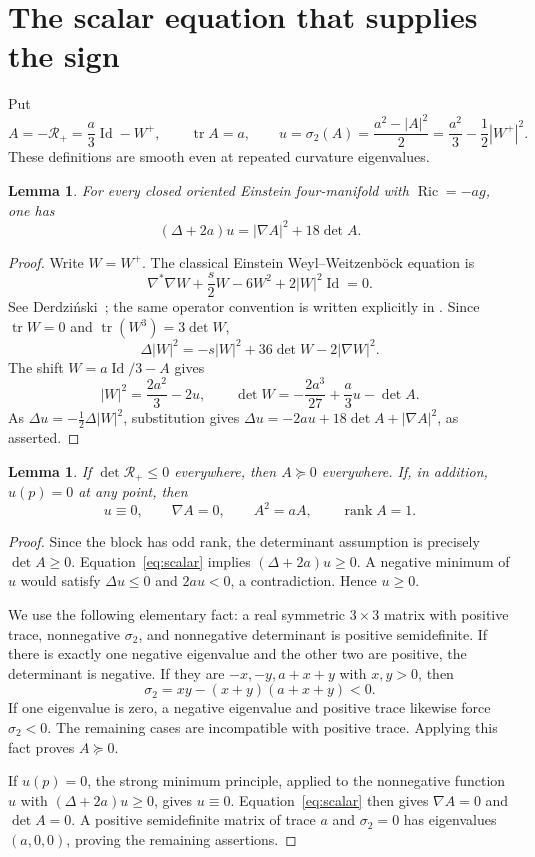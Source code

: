 \documentclass[11pt]{article}
\newtheorem{lemma}[theorem]{Lemma}
\theoremstyle{remark}\newtheorem{remark}[theorem]{Remark}
\newcommand{\Ric}{\operatorname{Ric}}
\newcommand{\tr}{\operatorname{tr}}
\newcommand{\Id}{\operatorname{Id}}
\newcommand{\RR}{\mathcal R_+}
\begin{document}
\section{The scalar equation that supplies the sign}
Put
\[
 A=-\RR=\frac a3\Id-W^+,\qquad \tr A=a,
 \qquad u=\sigma_2(A)=\frac{a^2-|A|^2}{2}
                  =\frac{a^2}{3}-\frac12|W^+|^2.
\]
These definitions are smooth even at repeated curvature eigenvalues.

\begin{lemma}\label{lem:scalar}
For every closed oriented Einstein four-manifold with $\Ric=-ag$, one has
\begin{equation}\label{eq:scalar}
 \boxed{(\Delta+2a)u=|\nabla A|^2+18\det A.}
\end{equation}
\end{lemma}
\begin{proof}
Write $W=W^+$. The classical Einstein Weyl--Weitzenb\"ock equation is
\begin{equation}\label{eq:weyl}
 \nabla^*\nabla W+\frac s2W-6W^2+2|W|^2\Id=0.
\end{equation}
See Derdzi\'nski~\cite{Derdzinski}; the same operator convention is written
explicitly in \cite[Lemma 2.5, $f=1$]{CD}.
Since $\tr W=0$ and $\tr(W^3)=3\det W$,
\[
 \Delta|W|^2=-s|W|^2+36\det W-2|\nabla W|^2.
\]
The shift $W=a\Id/3-A$ gives
\[
 |W|^2=\frac{2a^2}{3}-2u,
 \qquad
 \det W=-\frac{2a^3}{27}+\frac a3u-\det A.
\]
As $\Delta u=-\tfrac12\Delta|W|^2$, substitution gives
$\Delta u=-2au+18\det A+|\nabla A|^2$, as asserted.
\end{proof}

\begin{lemma}\label{lem:cone}
If $\det\RR\le0$ everywhere, then $A\succeq0$ everywhere.
If, in addition, $u(p)=0$ at any point, then
\[
 u\equiv0,\qquad \nabla A=0,\qquad A^2=aA,
 \qquad\operatorname{rank}A=1.
\]
\end{lemma}
\begin{proof}
Since the block has odd rank, the determinant assumption is precisely
$\det A\ge0$. Equation~\eqref{eq:scalar} implies
$(\Delta+2a)u\ge0$. A negative minimum of $u$ would satisfy
$\Delta u\le0$ and $2au<0$, a contradiction. Hence $u\ge0$.

We use the following elementary fact: a real symmetric $3\times3$ matrix
with positive trace, nonnegative $\sigma_2$, and nonnegative determinant
is positive semidefinite. If there is exactly one negative eigenvalue and
the other two are positive, the determinant is negative. If they are
$-x,-y,a+x+y$ with $x,y>0$, then
\[
 \sigma_2=xy-(x+y)(a+x+y)<0.
\]
If one eigenvalue is zero, a negative eigenvalue and positive trace likewise
force $\sigma_2<0$. The remaining cases are incompatible with positive
trace. Applying this fact proves $A\succeq0$.

If $u(p)=0$, the strong minimum principle, applied to the nonnegative
function $u$ with $(\Delta+2a)u\ge0$, gives $u\equiv0$.
Equation~\eqref{eq:scalar} then gives $\nabla A=0$ and $\det A=0$.
A positive semidefinite matrix of trace $a$ and $\sigma_2=0$ has eigenvalues
$(a,0,0)$, proving the remaining assertions.
\end{proof}
\end{document}
